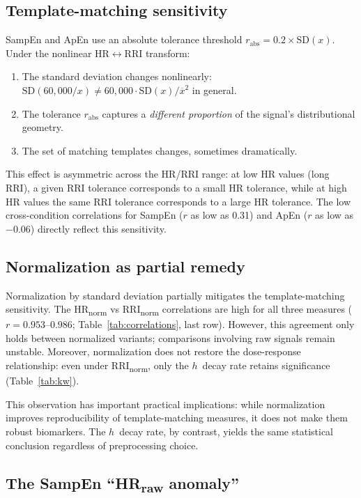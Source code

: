 \documentclass[12pt,a4paper]{article}
\begin{document}
\subsection{Template-matching sensitivity}\label{sec:template}

SampEn and ApEn use an absolute tolerance threshold $r_{\text{abs}} = 0.2 \times \text{SD}(x)$.
Under the nonlinear HR$\leftrightarrow$RRI transform:
\begin{enumerate}
  \item The standard deviation changes nonlinearly: $\text{SD}(60{,}000/x) \neq 60{,}000 \cdot \text{SD}(x) / \overline{x}^2$ in general.
  \item The tolerance $r_{\text{abs}}$ captures a \emph{different proportion} of the signal's distributional geometry.
  \item The set of matching templates changes, sometimes dramatically.
\end{enumerate}

This effect is asymmetric across the HR/RRI range: at low HR values (long RRI), a given RRI tolerance corresponds to a small HR tolerance, while at high HR values the same RRI tolerance corresponds to a large HR tolerance.
The low cross-condition correlations for SampEn ($r$ as low as 0.31) and ApEn ($r$ as low as $-0.06$) directly reflect this sensitivity.

\subsection{Normalization as partial remedy}\label{sec:normalization}

Normalization by standard deviation partially mitigates the template-matching sensitivity.
The HR\textsubscript{norm} vs RRI\textsubscript{norm} correlations are high for all three measures ($r = 0.953$--$0.986$; Table~\ref{tab:correlations}, last row).
However, this agreement only holds between normalized variants; comparisons involving raw signals remain unstable.
Moreover, normalization does not restore the dose-response relationship: even under RRI\textsubscript{norm}, only the $h$~decay rate retains significance (Table~\ref{tab:kw}).

This observation has important practical implications: while normalization improves reproducibility of template-matching measures, it does not make them robust biomarkers.
The $h$~decay rate, by contrast, yields the same statistical conclusion regardless of preprocessing choice.

\subsection{The SampEn ``HR\textsubscript{raw} anomaly''}\label{sec:anomaly}
\end{document}
